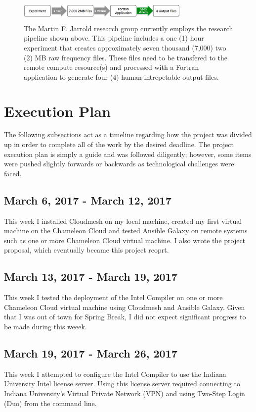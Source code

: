 \documentclass[9pt,twocolumn,twoside]{../../styles/osajnl}
\begin{document}
\begin{figure}
\centering
\includegraphics[height=0.45in, width=3.3in]{images/pipeline}
\caption{The Martin F. Jarrold research group currently employs the
  research pipeline shown above. This pipeline includes a one (1) hour
  experiment that creates approximately seven thousand (7,000) two (2)
  MB raw frequency files. These files need to be transfered to the
  remote compute resource(s) and processed with a Fortran application
  to generate four (4) human intrepetable output files.}
\label{fig:pipeline}
\end{figure}

\section{Execution Plan} \label{plan}
The following subsections act as a timeline regarding how the project
was divided up in order to complete all of the work by the desired
deadline. The project execution plan is simply a guide and was
followed diligently; however, some items were pushed slightly forwards
or backwards as technological challenges were faced.
\subsection{March 6, 2017 - March 12, 2017}
This week I installed Cloudmesh on my local machine, created my first
virtual machine on the Chameleon Cloud and tested Ansible Galaxy on
remote systems such as one or more Chameleon Cloud virtual machine. I
also wrote the project proposal, which eventually became this project
reoprt.
\subsection{March 13, 2017 - March 19, 2017}
This week I tested the deployment of the Intel Compiler on one or more
Chameleon Cloud virtual machine using Cloudmesh and Ansible
Galaxy. Given that I was out of town for Spring Break, I did not
expect significant progress to be made during this weeek.
\subsection{March 19, 2017 - March 26, 2017}
This week I attempted to configure the Intel Compiler to use the
Indiana University Intel license server. Using this license server
required connecting to Indiana University's Virtual Private Network
(VPN) and using Two-Step Login (Duo) from the command line.
\end{document}

